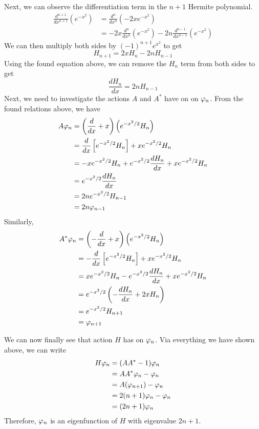 \begin{solution}
    Next, we can observe the differentiation term in the $n+1$ Hermite polynomial.
    \begin{align*}
        \frac{d^{n+1}}{dx^{n+1}}\left( e^{-x^2}\right) &= \frac{d^n}{dx^n}\left(-2xe^{-x^2}\right)\\
        &= -2x\frac{d^n}{dx^n}\left( e^{-x^2}\right) - 2n \frac{d^{n-1}}{dx^{n-1}}\left( e^{-x^2}\right)
    \end{align*}
    We can then multiply both sides by $(-1)^{n+1}e^{x^2}$ to get 
    \[H_{n+1} = 2xH_n - 2nH_{n-1}\]
    Using the found equation above, we can remove the $H_n$ term from both sides to get
    \[\frac{dH_n}{dx} = 2nH_{n-1}\]
    Next, we need to investigate the actions $A$ and $A^*$ have on on $\varphi_n$. From the found relations above, we have
    \begin{align*}
        A\varphi_n &= \left( \frac{d}{dx} + x\right)\left( e^{-x^2/2}H_n\right)\\
        &= \frac{d}{dx}\left[ e^{-x^2/2}H_n\right] + xe^{-x^2/2}H_n\\
        &= -xe^{-x^2/2}H_n + e^{-x^2/2}\frac{dH_n}{dx} + xe^{-x^2/2}H_n\\
        &= e^{-x^2/2}\frac{dH_n}{dx}\\
        &= 2ne^{-x^2/2}H_{n-1}\\
        &= 2n\varphi_{n-1}
    \end{align*}
    \newpage
    Similarly,
    \begin{align*}
        A^*\varphi_n &= \left(-\frac{d}{dx} + x\right)\left(e^{-x^2/2}H_n\right)\\
        &= -\frac{d}{dx}\left[ e^{-x^2/2}H_n\right] + xe^{-x^2/2}H_n\\
        &= xe^{-x^2/2}H_n - e^{-x^2/2}\frac{dH_n}{dx} + xe^{-x^2/2}H_n\\
        &= e^{-x^2/2}\left(-\frac{dH_n}{dx} + 2xH_n\right)\\
        &= e^{-x^2/2}H_{n+1}\\
        &= \varphi_{n+1}
    \end{align*}

    We can now finally see that action $H$ has on $\varphi_n$. Via everything we have shown above, we can write
    \begin{align*}
        H\varphi_n &= (AA^* - 1)\varphi_n\\
        &= AA^*\varphi_n - \varphi_n\\
        &= A(\varphi_{n+1}) - \varphi_n\\
        &= 2(n+1)\varphi_n - \varphi_n\\
        &= (2n+1)\varphi_n
    \end{align*}
    Therefore, $\varphi_n$ is an eigenfunction of $H$ with eigenvalue $2n+1$.
\end{solution}
